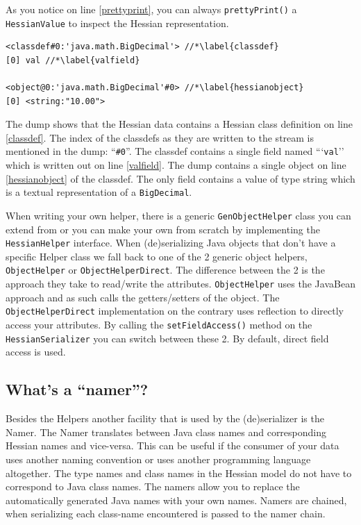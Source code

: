 \documentclass[a4paper]{article}
\begin{document}
As you notice on line \ref{prettyprint}, you can always \lstinline$prettyPrint()$ a \lstinline$HessianValue$ to inspect the Hessian representation. 

\medskip
\begin{lstlisting}
<classdef#0:'java.math.BigDecimal'> //*\label{classdef}
[0] val //*\label{valfield}

<object@0:'java.math.BigDecimal'#0> //*\label{hessianobject}
[0] <string:"10.00">
\end{lstlisting}
\medskip

The dump shows that the Hessian data contains a Hessian class definition on line \ref{classdef}. The index of the classdefs as they are written to the stream is mentioned in the dump: ``\lstinline$#0$''. The classdef contains a single field named ```\lstinline$val$'' which is written out on line \ref{valfield}. The dump contains a single object on line \ref{hessianobject} of the classdef. The only field contains a value of type string which is a textual representation of a \lstinline$BigDecimal$.


When writing your own helper, there is a generic \lstinline$GenObjectHelper$ class you can extend from or you can make your own from scratch by implementing the \lstinline$HessianHelper$ interface.  When (de)serializing Java objects that don't have a specific Helper class we fall back to one of the 2 generic object helpers, \lstinline$ObjectHelper$ or \lstinline$ObjectHelperDirect$. The difference between the 2 is the approach they take to read/write the attributes. \lstinline$ObjectHelper$ uses the JavaBean approach and as such calls the getters/setters of the object.  The \lstinline$ObjectHelperDirect$ implementation on the contrary uses reflection to directly access your attributes. By calling the \lstinline$setFieldAccess()$ method on the \lstinline$HessianSerializer$ you can switch between these 2. 
By default, direct field access is used.

\subsection{What's a ``namer''?}

Besides the Helpers another facility that is used by the (de)serializer is the Namer. The Namer translates between Java class names and corresponding Hessian names and vice-versa. This can be useful if the consumer of your data uses another naming convention or uses another programming language altogether. The type names and class names in the Hessian model do not have to correspond to Java class names. The namers allow you to replace the automatically generated Java names with your own names. Namers are chained, when serializing each class-name encountered is passed to the namer chain.
\end{document}
